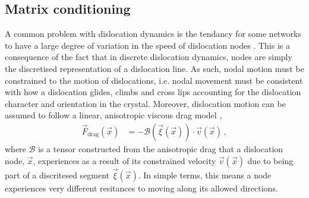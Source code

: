 \subsection{Matrix conditioning}
\label{ss:matrix}

A common problem with dislocation dynamics is the tendancy for some networks to have a large degree of variation in the speed of dislocation nodes \cite{bertin2019gpu,ddlab,arsenlis2007enabling}. This is a consequence of the fact that in discrete dislocation dynamics, nodes are simply the discretised representation of a dislocation line. As such, nodal motion must be constrained to the motion of dislocations, i.e. nodal movement must be consistent with how a dislocation glides, climbs and cross lips accounting for the dislocation character and orientation in the crystal. Moreover, dislocation motion can be assumed to follow a linear, anisotropic viscous drag model \cite{ddlab},
\begin{align}\label{eq:dragCoef}
    \vec{F}_\textrm{drag}(\vec{x}) & = -\mathcal{B}(\vec{\xi}(\vec{x})) \cdot \vec{v}(\vec{x})\,,
\end{align}
where $\mathcal{B}$ is a tensor constructed from the anisotropic drag that a dislocation node, $\vec{x}$, experiences as a result of its constrained velocity $\vec{v}(\vec{x})$ due to being part of a discritesed segment $\vec{\xi}(\vec{x})$. In simple terms, this means a node experiences very different resitances to moving along its allowed directions.


